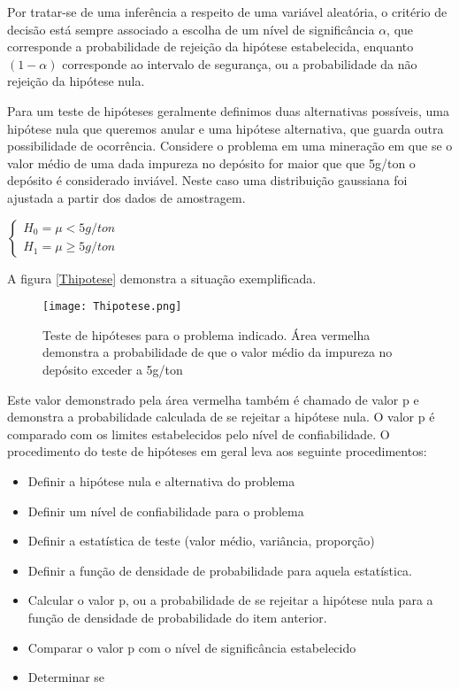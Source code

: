 Por tratar-se de uma inferência a respeito de uma variável aleatória, o critério de decisão está sempre associado a escolha de um nível de significância $\alpha$, que corresponde a probabilidade de rejeição da hipótese estabelecida, enquanto $(1-\alpha)$ corresponde ao intervalo de segurança, ou a probabilidade da não rejeição da hipótese nula.   

Para um teste de hipóteses geralmente definimos duas alternativas possíveis, uma hipótese nula que queremos anular e uma hipótese alternativa, que guarda outra possibilidade de ocorrência. Considere o problema em uma mineração em que se o valor médio de uma dada impureza no depósito for maior que que 5g/ton o depósito é considerado inviável. Neste caso uma distribuição gaussiana foi ajustada a partir dos dados de amostragem. 

$\left\{\begin{matrix}

 	H_{0} = \mu <  5g/ton \\ 
 	H_{1} = \mu \geqslant 5g/ton
 	
\end{matrix}\right.$

A figura \eqref{Thipotese} demonstra a situação exemplificada.

\begin{figure}[H]
  	\centering
  	\texttt{[image: Thipotese.png]}	
  	\caption{Teste de hipóteses para o problema indicado. Área vermelha demonstra a probabilidade de que o valor médio da impureza no depósito exceder a 5g/ton  }
  	\label{Thipotese}
\end{figure}


Este valor demonstrado pela área vermelha também é chamado de valor p e demonstra a probabilidade calculada de se rejeitar a hipótese nula. O valor p é comparado com os limites estabelecidos pelo nível de confiabilidade. O procedimento do teste de hipóteses em geral leva aos seguinte procedimentos:

\begin{itemize}
	\item Definir a hipótese nula e alternativa do problema
	\item Definir um nível de confiabilidade para o problema
	\item Definir a estatística de teste (valor médio, variância, proporção)
	\item Definir a função de densidade de probabilidade para aquela estatística.
	\item Calcular o valor p, ou a probabilidade de se rejeitar a hipótese nula para a função de densidade de probabilidade do item anterior.
	\item Comparar o valor p com o nível de significância estabelecido
	\item Determinar se 
\end{itemize} 


